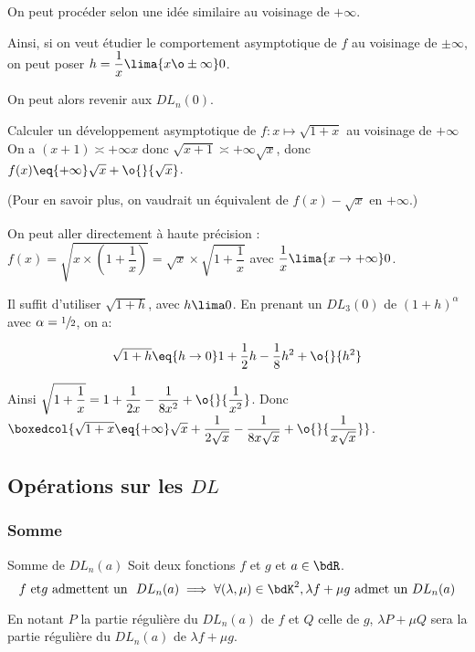 \documentclass[a4paper,french,bookmarks]{article}
\begin{document}
On peut procéder selon une idée similaire au voisinage de $+\infty$.

Ainsi, si on veut étudier le comportement asymptotique de $f$ au voisinage de $\pm\infty$, on peut poser $h = \dfrac{1}{x} \lima{x \o \pm\infty} 0$.

On peut alors revenir aux $DL_n(0)$.

\begin{example}{}{}
    Calculer un développement asymptotique de $f : x \mapsto \sqrt{1+x}$ au voisinage de $+\infty$
    \tcblower
    On a $(x+1) \asymp{+\infty} x$ donc $\sqrt{x+1} \asymp{+\infty} \sqrt{x}$, donc $f(x) \eq{+\infty} \sqrt{x} + \o{}{\sqrt{x}}$.
    
    (Pour en savoir plus, on vaudrait un équivalent de $f(x) - \sqrt{x}$ en $+\infty$.)
    
    On peut aller directement à haute précision : $f(x) = \sqrt{x\times\left(1+\dfrac{1}{x}\right)}=\sqrt{x}\times\sqrt{1+\dfrac{1}{x}}$ avec $\dfrac{1}{x} \lima{x \to +\infty} 0$.
    
    Il suffit d'utiliser $\sqrt{1+h}$, avec $h \lima 0$. En prenant un $DL_3(0)$ de $(1+h)^\alpha$ avec $\alpha = \sfrac{1}{2}$, on a:
    
    \[\sqrt{1+h} \eq{h \to 0} 1+\dfrac{1}{2}h - \dfrac{1}{8}h^2 + \o{}{h^2}\]
    
    Ainsi $\sqrt{1+\dfrac{1}{x}} = 1 + \dfrac{1}{2x} - \dfrac{1}{8x^2} + \o{}{\dfrac{1}{x^2}}$. Donc $\boxedcol{\sqrt{1+x} \eq{+\infty} \sqrt{x} + \dfrac{1}{2\sqrt{x}} - \dfrac{1}{8x\sqrt{x}} + \o{}{\dfrac{1}{x\sqrt{x}}}}$.
\end{example}

\subsection{Opérations sur les $DL$}

\subsubsection{Somme}

\begin{property}{Somme de $DL_n(a)$}{}
    Soit deux fonctions $f$ et $g$ et $a \in \bdR$.
    \[ f \ \text{et} g \ \text{admettent un } \ DL_n(a) \implies \forall (\lambda, \mu) \in \bdK^2, \lambda f + \mu g \ \text{admet un} \ DL_n(a)\]
    
    En notant $P$ la partie régulière du $DL_n(a)$ de $f$ et $Q$ celle de $g$, $\lambda P + \mu Q$ sera la partie régulière du $DL_n(a)$ de $\lambda f + \mu g$.
\end{property}
\end{document}
